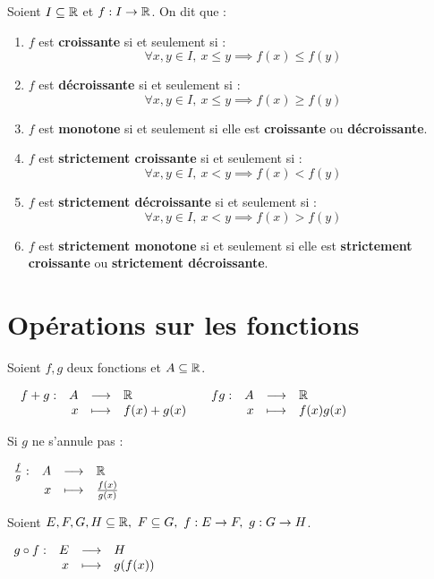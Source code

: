 \begin{definition}
	Soient $I \subseteq \mathbb{R}$ et $f : I \to \mathbb{R}$. On dit que :
    \begin{enumerate}
        \item $f$ est \textbf{croissante} si et seulement si :
        \[ \forall x, y \in I,\ x \leq y \implies f(x) \leq f(y) \]
        \item $f$ est \textbf{décroissante} si et seulement si : 
        \[ \forall x, y \in I,\ x \leq y \implies f(x) \geq f(y) \]
        \item $f$ est \textbf{monotone} si et seulement si elle est \textbf{croissante} ou \textbf{décroissante}.
        \item $f$ est \textbf{strictement croissante} si et seulement si : 
        \[ \forall x, y \in I,\ x < y \implies f(x) < f(y) \]
        \item $f$ est \textbf{strictement décroissante} si et seulement si :
        \[ \forall x, y \in I,\ x < y \implies f(x) > f(y) \]
        \item $f$ est \textbf{strictement monotone} si et seulement si elle est \textbf{strictement croissante} ou \textbf{strictement décroissante}.
    \end{enumerate}
\end{definition}

\section{Opérations sur les fonctions}
\begin{definition}
	Soient $f, g$ deux fonctions et $A \subseteq \mathbb{R}$.
	\begin{center}
		$
		\begin{array}{cc}
			\begin{array}{rrcl} f+g : & A & \longrightarrow & \mathbb{R} \\ & x & \longmapsto & f(x)+g(x) \end{array}
			&
			\begin{array}{rrcl} fg : & A & \longrightarrow & \mathbb{R} \\ & x & \longmapsto & f(x)g(x) \end{array}
		\end{array}
		$
	\end{center}
	Si $g$ ne s'annule pas :
	\begin{center}
		$
		\begin{array}{rrcl} \frac{f}{g} : & A & \longrightarrow & \mathbb{R} \\ & x & \longmapsto & \frac{f(x)}{g(x)} \end{array}
		$
	\end{center}
\end{definition}

\begin{definition}
	Soient $E, F, G, H \subseteq \mathbb{R},\ F \subseteq G,\ f : E \to F,\ g : G \to H$.
	\begin{center}
		$
		\begin{array}{rrcl} g \circ f : & E & \longrightarrow & H \\ & x & \longmapsto & g(f(x)) \end{array}
		$
	\end{center}
\end{definition}

